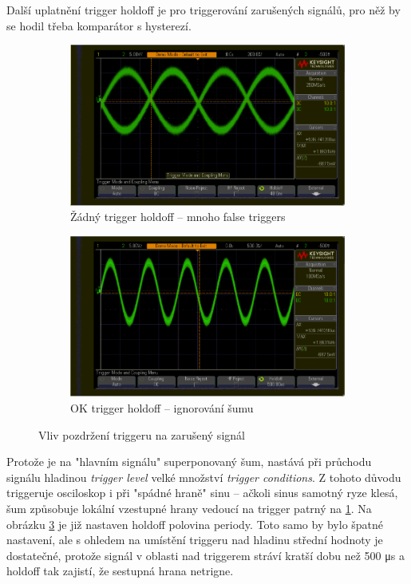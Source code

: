 \documentclass[twoside]{article}
\begin{document}
Další uplatnění trigger holdoff je pro triggerování zarušených signálů, pro něž by se hodil třeba komparátor s hysterezí.
\begin{figure}[htbp]
	\centering
	\begin{subfigure}{0.45\textwidth}
		\includegraphics[width=\linewidth]{noisy_sinus_false_trigger.png                      }
		\caption{Žádný trigger holdoff -- mnoho false triggers}
		\label{fig:noisy_sin_bad}
	\end{subfigure}
	\begin{subfigure}{0.45\textwidth}
		\includegraphics[width=\linewidth]{noisy_sinus_good_trigger.png                    }
		\caption{OK trigger holdoff -- ignorování šumu}
		\label{fig:noisy_sin_good}
	\end{subfigure}
	\caption{Vliv pozdržení triggeru na zarušený signál}
\end{figure}
Protože je na "hlavním signálu" superponovaný šum, nastává při průchodu signálu hladinou \textit{trigger level} velké množství \textit{trigger conditions}.
Z tohoto důvodu triggeruje osciloskop i při "spádné hraně" sinu -- ačkoli sinus samotný ryze klesá,
šum způsobuje lokální vzestupné hrany vedoucí na trigger patrný na \ref{fig:noisy_sin_bad}. Na obrázku \ref{fig:noisy_sin_good} je již nastaven 
holdoff polovina periody. Toto samo by bylo špatné nastavení, ale s ohledem na umístění triggeru nad hladinu střední hodnoty je dostatečné,
protože signál v oblasti nad triggerem stráví kratší dobu než 500 \si{\micro\second} a holdoff tak zajistí, že sestupná
hrana netrigne.
\end{document}
